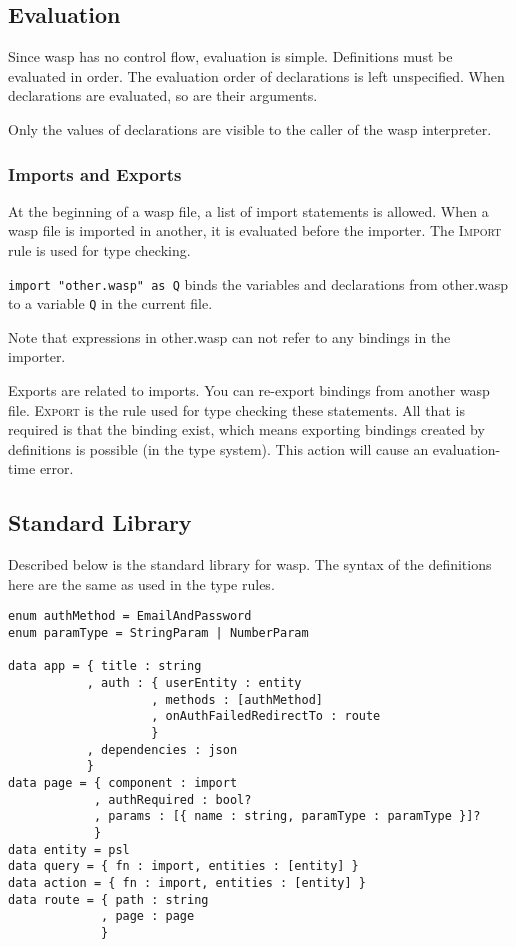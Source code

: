 \subsection{Evaluation}

Since wasp has no control flow, evaluation is simple. Definitions must be
evaluated in order. The evaluation order of declarations is left
unspecified. When declarations are evaluated, so are their arguments.

Only the values of declarations are visible to the caller of the wasp
interpreter.

\subsubsection{Imports and Exports}

At the beginning of a wasp file, a list of import statements is allowed. When
a wasp file is imported in another, it is evaluated before the importer. The
\textsc{Import} rule is used for type checking. 

\texttt{import "other.wasp" as Q} binds the variables and declarations from
other.wasp to a variable \texttt{Q} in the current file.

Note that expressions in other.wasp can not refer to any
bindings in the importer.

Exports are related to imports. You can re-export bindings from another wasp
file. \textsc{Export} is the rule used for type checking these statements. All
that is required is that the binding exist, which means exporting bindings
created by definitions is possible (in the type system). This action will cause
an evaluation-time error.

\subsection{Standard Library}

Described below is the standard library for wasp. The syntax of the definitions
here are the same as used in the type rules.

\begin{verbatim}
enum authMethod = EmailAndPassword
enum paramType = StringParam | NumberParam

data app = { title : string
           , auth : { userEntity : entity
                    , methods : [authMethod]
                    , onAuthFailedRedirectTo : route
                    }
           , dependencies : json
           }
data page = { component : import
            , authRequired : bool?
            , params : [{ name : string, paramType : paramType }]?
            }
data entity = psl
data query = { fn : import, entities : [entity] }
data action = { fn : import, entities : [entity] }
data route = { path : string
             , page : page
             }
\end{verbatim}

